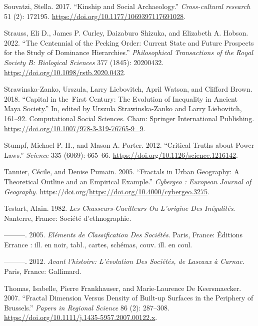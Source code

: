 \documentclass[
  12pt,
  a4paper, twoside]{book}
\newlength{\cslhangindent}
\newlength{\cslentryspacingunit} %
\newenvironment{CSLReferences}[2] %
 {%
  \setlength{\parindent}{0pt}
  \ifodd #1
  \let\oldpar\par
  \def\par{\hangindent=\cslhangindent\oldpar}
  \fi
  \setlength{\parskip}{#2\cslentryspacingunit}
 }%
 {}
\begin{document}
\begin{CSLReferences}{1}{0}
\leavevmode{}%
Souvatzi, Stella. 2017. {``Kinship and Social Archaeology.''} \emph{Cross-cultural research} 51 (2): 172195. \url{https://doi.org/10.1177/1069397117691028}.

\leavevmode{}%
Strauss, Eli D., James P. Curley, Daizaburo Shizuka, and Elizabeth A. Hobson. 2022. {``The Centennial of the Pecking Order: Current State and Future Prospects for the Study of Dominance Hierarchies.''} \emph{Philosophical Transactions of the Royal Society B: Biological Sciences} 377 (1845): 20200432. \url{https://doi.org/10.1098/rstb.2020.0432}.

\leavevmode{}%
Strawinska-Zanko, Urszula, Larry Liebovitch, April Watson, and Clifford Brown. 2018. {``Capital in the~First Century: The Evolution of Inequality in Ancient Maya Society.''} In, edited by Urszula Strawinska-Zanko and Larry Liebovitch, 161--92. Computational Social Sciences. Cham: Springer International Publishing. \url{https://doi.org/10.1007/978-3-319-76765-9_9}.

\leavevmode{}%
Stumpf, Michael P. H., and Mason A. Porter. 2012. {``Critical Truths about Power Laws.''} \emph{Science} 335 (6069): 665--66. \url{https://doi.org/10.1126/science.1216142}.

\leavevmode{}%
Tannier, Cécile, and Denise Pumain. 2005. {``Fractals in Urban Geography: A Theoretical Outline and an Empirical Example.''} \emph{Cybergeo : European Journal of Geography}. https://doi.org/\url{https://doi.org/10.4000/cybergeo.3275}.

\leavevmode{}%
Testart, Alain. 1982. \emph{Les Chasseurs-Cueilleurs Ou L'origine Des Inégalités}. Nanterre, France: Société d'ethnographie.

\leavevmode{}%
---------. 2005. \emph{Eléments de Classification Des Sociétés}. Paris, France: Éditions Errance : ill. en noir, tabl., cartes, schémas, couv. ill. en coul.

\leavevmode{}%
---------. 2012. \emph{Avant l'histoire: L'évolution Des Sociétés, de Lascaux à Carnac}. Paris, France: Gallimard.

\leavevmode{}%
Thomas, Isabelle, Pierre Frankhauser, and Marie-Laurence De Keersmaecker. 2007. {``Fractal Dimension Versus Density of Built-up Surfaces in the Periphery of Brussels.''} \emph{Papers in Regional Science} 86 (2): 287--308. \url{https://doi.org/10.1111/j.1435-5957.2007.00122.x}.


\end{CSLReferences}
\end{document}
